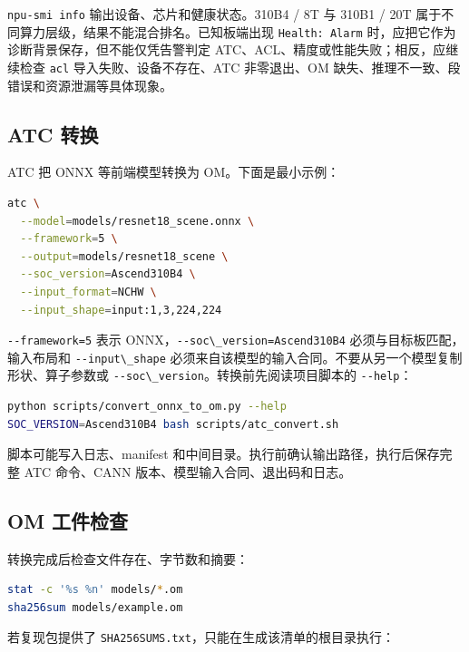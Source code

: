\passthrough{\lstinline!npu-smi info!} 输出设备、芯片和健康状态。310B4 /
8T 与 310B1 / 20T 属于不同算力层级，结果不能混合排名。已知板端出现
\passthrough{\lstinline!Health: Alarm!}
时，应把它作为诊断背景保存，但不能仅凭告警判定
ATC、ACL、精度或性能失败；相反，应继续检查 \passthrough{\lstinline!acl!}
导入失败、设备不存在、ATC 非零退出、OM
缺失、推理不一致、段错误和资源泄漏等具体现象。

\subsection{ATC 转换}\label{atc-ux8f6cux6362}

ATC 把 ONNX 等前端模型转换为 OM。下面是最小示例：

\begin{lstlisting}[language=bash]
atc \
  --model=models/resnet18_scene.onnx \
  --framework=5 \
  --output=models/resnet18_scene \
  --soc_version=Ascend310B4 \
  --input_format=NCHW \
  --input_shape=input:1,3,224,224
\end{lstlisting}

\passthrough{\lstinline!--framework=5!} 表示
ONNX，\passthrough{\lstinline!--soc\_version=Ascend310B4!}
必须与目标板匹配，输入布局和 \passthrough{\lstinline!--input\_shape!}
必须来自该模型的输入合同。不要从另一个模型复制形状、算子参数或
\passthrough{\lstinline!--soc\_version!}。转换前先阅读项目脚本的
\passthrough{\lstinline!--help!}：

\begin{lstlisting}[language=bash]
python scripts/convert_onnx_to_om.py --help
SOC_VERSION=Ascend310B4 bash scripts/atc_convert.sh
\end{lstlisting}

脚本可能写入日志、manifest
和中间目录。执行前确认输出路径，执行后保存完整 ATC 命令、CANN
版本、模型输入合同、退出码和日志。

\subsection{OM 工件检查}\label{om-ux5de5ux4ef6ux68c0ux67e5}

转换完成后检查文件存在、字节数和摘要：

\begin{lstlisting}[language=bash]
stat -c '%s %n' models/*.om
sha256sum models/example.om
\end{lstlisting}

若复现包提供了
\passthrough{\lstinline!SHA256SUMS.txt!}，只能在生成该清单的根目录执行：

